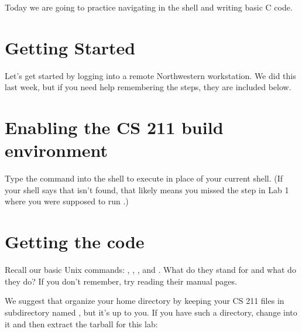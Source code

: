 \documentclass{tufte-handout}
\begin{document}
\maketitle

Today we are going to practice navigating in the shell and writing basic
C code.

\section{Getting Started}

Let's get started by logging into a remote Northwestern workstation. We
did this last week, but if you need help remembering the steps, they are
included below.

\section{Enabling the CS 211 build environment}

Type the command  into the shell to execute
 in place of your current shell. (If your shell says that
 isn’t found, that likely means you missed the step in
Lab 1 where you were supposed to run .)

\section{Getting the code}

Recall our basic Unix commands: , ,
, and . What do they stand for and what do
they do? If you don't remember, try reading their manual pages.

We suggest that organize your home directory by keeping your CS 211
files in subdirectory named , but it's up to you. If you have
such a directory, change into it and then extract the tarball for this
lab:
\end{document}
